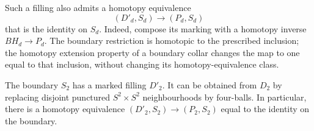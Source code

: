 Such a filling also admits a homotopy equivalence
\begin{equation}
\label{ch:relative-filling-map}
 (D'_d,S_d)\longrightarrow(P_d,S_d)
\end{equation}
that is the identity on $S_d$.  Indeed, compose its marking
with a homotopy inverse $BH_d\to P_d$.  The boundary
restriction is homotopic to the prescribed inclusion;
the homotopy extension property of a boundary collar
changes the map to one equal to that inclusion, without
changing its homotopy-equivalence class.

\begin{proposition}
\label{ch:even-filling}
The boundary $S_2$ has a marked filling $D'_2$.  It can be
obtained from $D_2$ by replacing disjoint punctured
$S^2\times S^2$ neighbourhoods by four-balls.  In particular,
there is a homotopy equivalence $(D'_2,S_2)\to(P_2,S_2)$
equal to the identity on the boundary.
\end{proposition}

